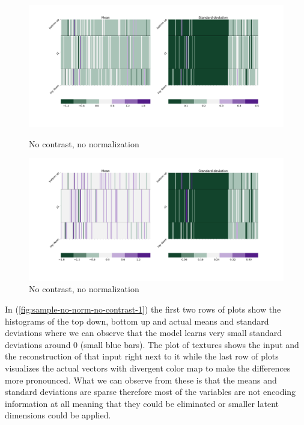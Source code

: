 \documentclass[12pt, english]{article}
\begin{document}
\begin{figure}[H]
  \begin{minipage}{0.5\linewidth}
    \centering
    \includegraphics[width=.75\linewidth]{z1_vis/14_DenseLinLinLadderVAE_noContrastNorm_-stats-1_vector_comparisons_1.png} 
    \caption{No contrast, no normalization}
    \label{fig:sample-no-norm-no-contrast-1}
  \end{minipage}
  \begin{minipage}{0.5\linewidth}
    \centering
    \includegraphics[width=.75\linewidth]{z1_vis/14_DenseLinLinLadderVAE_noContrastNorm_-stats-2_vector_comparisons_1.png}
    \caption{No contrast, no normalization}
    \label{fig:sample-no-norm-no-contrast-2}
  \end{minipage}
\end{figure}

\par In (\ref{fig:sample-no-norm-no-contrast-1}) the first two rows of plots show the histograms of the top down, bottom up and actual means and standard deviations where we can observe that the model learns very small standard deviations around 0 (small blue bars). The plot of textures shows the input and the reconstruction of that input right next to it while the last row of plots visualizes the actual vectors with divergent color map to make the differences more pronounced. What we can observe from these is that the means and standard deviations are sparse therefore most of the variables are not encoding information at all meaning that they could be eliminated or smaller latent dimensions could be applied.

\vspace{4mm}
\end{document}
